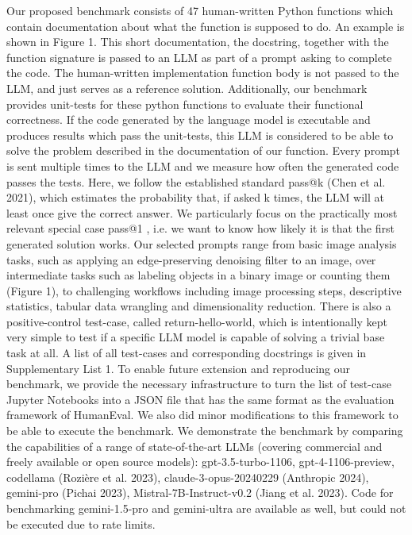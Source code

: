 \documentclass[doubleblind]{ecai}
\begin{document}
Our proposed benchmark consists of 47 human-written Python functions which contain documentation about what the function is supposed to do. An example is shown in Figure 1. This short documentation, the docstring, together with the function signature is passed to an LLM as part of a prompt asking to complete the code. The human-written implementation function body is not passed to the LLM, and just serves as a reference  solution. Additionally, our benchmark provides unit-tests for these python functions to evaluate their functional correctness. If the code generated by  the language model is executable and produces results which pass the unit-tests, this LLM is considered to be able to solve the problem described in the documentation of our function. Every prompt is sent multiple times to the LLM and we measure how often the generated  code passes the tests. Here, we follow the established standard pass@k (Chen et al. 2021), which estimates the probability that, if asked k times, the LLM will at least once give the correct answer. We particularly focus on the practically most relevant special case pass@1 , i.e. we want to know how likely it is that the first generated solution works.  
Our selected prompts range from basic image analysis tasks, such as applying an edge-preserving denoising filter to an image, over intermediate tasks such as labeling objects in a binary image or counting them (Figure 1), to challenging workflows including image processing steps, descriptive statistics, tabular data wrangling and dimensionality reduction. There is also a positive-control test-case, called return-hello-world, which is intentionally kept very simple to test if a specific LLM model is  capable of solving a trivial base task at all. A list of all test-cases and corresponding docstrings is given in Supplementary List 1.
To enable future extension and reproducing our benchmark, we provide the necessary infrastructure to turn the list of test-case Jupyter Notebooks into a JSON file that has the same format as the evaluation framework of HumanEval. We also did minor modifications to this framework to be able to execute the benchmark.
We demonstrate the benchmark by comparing the capabilities of a range of state-of-the-art  LLMs (covering commercial and freely available or open source models): gpt-3.5-turbo-1106, gpt-4-1106-preview, codellama (Rozière et al. 2023), claude-3-opus-20240229 (Anthropic 2024), gemini-pro (Pichai 2023),  Mistral-7B-Instruct-v0.2 (Jiang et al. 2023). Code for benchmarking gemini-1.5-pro and gemini-ultra are available as well, but could not be executed due to rate limits. 
\end{document}
